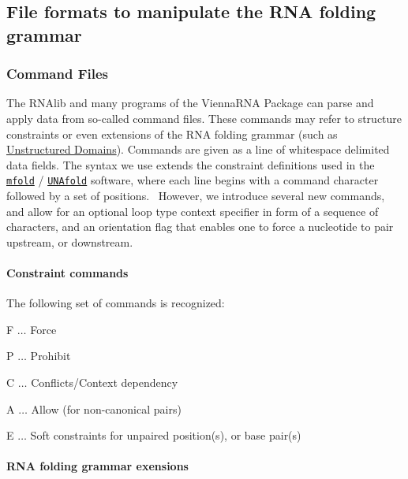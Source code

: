 \hypertarget{file_formats_constraint-formats}{}\subsection{File formats to manipulate the R\+N\+A folding grammar}\label{file_formats_constraint-formats}
\hypertarget{file_formats_constraint-formats-file}{}\subsubsection{Command Files}\label{file_formats_constraint-formats-file}
The R\+N\+Alib and many programs of the Vienna\+R\+NA Package can parse and apply data from so-\/called command files. These commands may refer to structure constraints or even extensions of the R\+NA folding grammar (such as \hyperlink{group__domains__up}{Unstructured Domains}). Commands are given as a line of whitespace delimited data fields. The syntax we use extends the constraint definitions used in the \href{http://mfold.rna.albany.edu/?q=mfold}{\tt mfold} / \href{http://mfold.rna.albany.edu/?q=DINAMelt/software}{\tt U\+N\+Afold} software, where each line begins with a command character followed by a set of positions.~\newline
However, we introduce several new commands, and allow for an optional loop type context specifier in form of a sequence of characters, and an orientation flag that enables one to force a nucleotide to pair upstream, or downstream.\hypertarget{file_formats_constraint_commands}{}\paragraph{Constraint commands}\label{file_formats_constraint_commands}
The following set of commands is recognized\+:
\begin{DoxyItemize}
\item {\ttfamily F} $ \ldots $ Force
\item {\ttfamily P} $ \ldots $ Prohibit
\item {\ttfamily C} $ \ldots $ Conflicts/\+Context dependency
\item {\ttfamily A} $ \ldots $ Allow (for non-\/canonical pairs)
\item {\ttfamily E} $ \ldots $ Soft constraints for unpaired position(s), or base pair(s)
\end{DoxyItemize}\hypertarget{file_formats_domain_commands}{}\paragraph{R\+N\+A folding grammar exensions}\label{file_formats_domain_commands}

